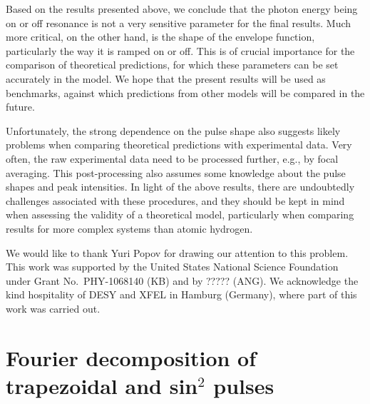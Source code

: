 \documentclass[12pt, aps,pra,amsmath,amssymb,showpacs,twocolumn,preprintnumbers,
floatfix,letterpaper]{revtex4-1}
\begin{document}
Based on the results presented above, we conclude that the photon energy being on or off resonance is not a very sensitive parameter for the final results. Much more critical, on the other hand, is the shape of the envelope function, particularly the way it is ramped on or off. This is of crucial importance for the comparison of theoretical predictions, for which these parameters can be set accurately in the model. We hope that the present results will be used as benchmarks, against which predictions from other models will be compared in the future.

Unfortunately, the strong dependence on the pulse shape also suggests likely problems when comparing theoretical predictions with experimental data. Very often, the raw experimental data need to be processed further, e.g., by focal averaging. This post-processing also assumes some knowledge about the pulse shapes and peak intensities. In light of the above results, there are undoubtedly challenges associated with these procedures, and they should be kept in mind when assessing the validity of a theoretical model, particularly when comparing results for more complex systems than atomic hydrogen.



\begin{acknowledgments}
We would like to thank Yuri Popov for drawing our attention to this problem.
This work was supported by the United States National Science Foundation under Grant No.~PHY-1068140 (KB) 
and by ????? (ANG).
We acknowledge the kind hospitality of DESY and XFEL in Hamburg (Germany), where part of this work was carried out.
\end{acknowledgments}

\appendix

\section{Fourier decomposition of trapezoidal and sin$^2$ pulses}
\end{document}
